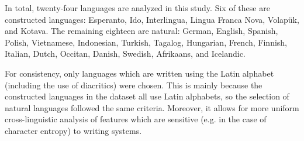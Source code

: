 \documentclass[12pt,a4paper]{article}
\numberwithin{figure}{section}
\numberwithin{table}{section}
\numberwithin{definition}{section}
\begin{document}
In total, twenty-four languages are analyzed in this study. Six of these are constructed languages: Esperanto, Ido, Interlingua, Lingua Franca Nova, Volapük, and Kotava. The remaining eighteen are natural: German, English, Spanish, Polish, Vietnamese, Indonesian, Turkish, Tagalog, Hungarian, French, Finnish, Italian, Dutch, Occitan, Danish, Swedish, Afrikaans, and Icelandic. 

For consistency, only languages which are written using the Latin alphabet (including the use of diacritics) were chosen. This is mainly because the constructed languages in the dataset all use Latin alphabets, so the selection of natural languages followed the same criteria. Moreover, it allows for more uniform cross-linguistic analysis of features which are sensitive (e.g. in the case of character entropy) to writing systems.

\end{document}
